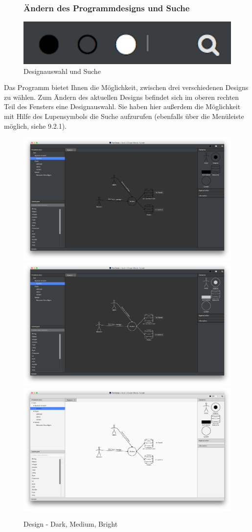 \pagebreak
\begin{figure}[H]
\subsubsection{Ändern des Programmdesigns und Suche}
	\centering
	\includegraphics[width=.4\textwidth]{Design_Aendern.png}
	\caption{Designauswahl und Suche}
\end{figure}
Das Programm bietet Ihnen die Möglichkeit, zwischen drei verschiedenen Designs zu wählen. Zum Ändern des aktuellen Designs befindet sich im oberen rechten Teil des Fensters eine Designauswahl. Sie haben hier außerdem die Möglichkeit mit Hilfe des Lupensymbols die Suche aufzurufen (ebenfalls über die Menüleiste möglich, siehe 9.2.1).
\begin{figure}[H]
	\centering
	\includegraphics[width=.45\textwidth]{Design_Dark.png}
	\includegraphics[width=.45\textwidth]{Design_Medium.png}
	\includegraphics[width=.45\textwidth]{Design_Bright.png}
	\caption{Design - Dark, Medium, Bright}
\end{figure}

